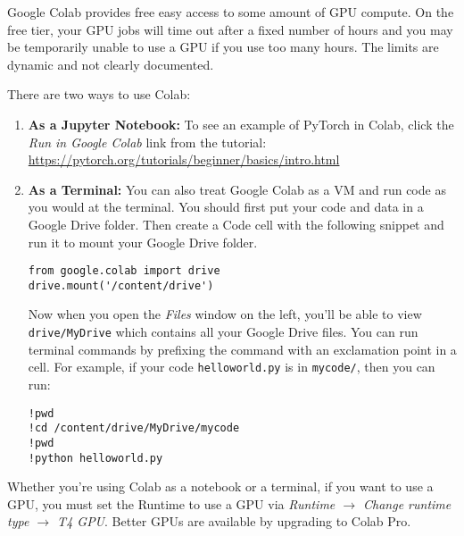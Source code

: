 \documentclass[11pt,addpoints,answers]{exam}
\begin{document}
Google Colab provides free easy access to some amount of GPU compute. On the free tier, your GPU jobs will time out after a fixed number of hours and you may be temporarily unable to use a GPU if you use too many hours. The limits are dynamic and not clearly documented.

There are two ways to use Colab: 

\begin{enumerate}
\item \textbf{As a Jupyter Notebook:} To see an example of PyTorch in Colab, click the \emph{Run in Google Colab} link from the tutorial: \url{https://pytorch.org/tutorials/beginner/basics/intro.html}

\item \textbf{As a Terminal:} You can also treat Google Colab as a VM and run code as you would at the terminal. You should first put your code and data in a Google Drive folder. Then create a Code cell with the following snippet and run it to mount your Google Drive folder. 
\begin{lstlisting}
from google.colab import drive
drive.mount('/content/drive')
\end{lstlisting}
Now when you open the \emph{Files} window on the left, you'll be able to view \lstinline{drive/MyDrive}
which contains all your Google Drive files. You can run terminal commands by prefixing the command with an exclamation point in a cell. For example, if your code \lstinline{helloworld.py} is in \lstinline{mycode/}, then you can run:
\begin{lstlisting}
!pwd
!cd /content/drive/MyDrive/mycode
!pwd
!python helloworld.py
\end{lstlisting}
    
\end{enumerate}

Whether you're using Colab as a notebook or a terminal, if you want to use a GPU, you must set the Runtime to use a GPU via \emph{Runtime $\rightarrow$ Change runtime type $\rightarrow$ T4 GPU}. Better GPUs are available by upgrading to Colab Pro.
\end{document}
